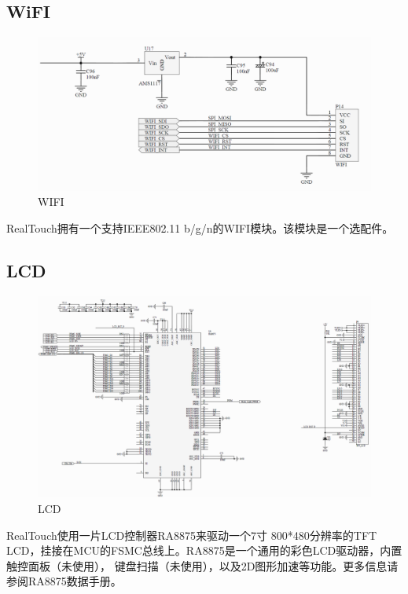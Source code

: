 \documentclass[titlepage]{article}
\begin{document}
  \subsection{WiFI}
  \begin{figure}[h]
  \centering
  \includegraphics[width=15cm]{wifi.png}
  \caption{WIFI}
 \end{figure}
 RealTouch拥有一个支持IEEE802.11 b/g/n的WIFI模块。该模块是一个选配件。
 \newpage
   \subsection{LCD}
  \begin{figure}[h]
  \centering
  \includegraphics[width=15cm]{lcd.png}
  \caption{LCD}
 \end{figure}
 RealTouch使用一片LCD控制器RA8875来驱动一个7寸 800*480分辨率的TFT LCD，挂接在MCU的FSMC总线上。RA8875是一个通用的彩色LCD驱动器，内置触控面板（未使用），
 键盘扫描（未使用），以及2D图形加速等功能。更多信息请参阅RA8875数据手册。
 \newpage
\end{document}
